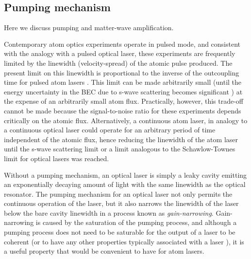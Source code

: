 \subsection{Pumping mechanism}

Here we discuss pumping and matter-wave amplification.

Contemporary atom optics experiments operate in pulsed mode, and consistent with the analogy with a pulsed optical laser, these experiments are frequently limited by the linewidth (velocity-spread) of the atomic pulse produced. The present limit on this linewidth is proportional to the inverse of the outcoupling time for pulsed atom lasers \cite{Johnsson:2007}.  This limit can be made arbitrarily small (until the energy uncertainty in the BEC due to s-wave scattering becomes significant \cite{Johnsson:2007a}) at the expense of an arbitrarily small atom flux.  Practically, however, this trade-off cannot be made because the signal-to-noise ratio for these experiments depends critically on the atomic flux.  Alternatively, a continuous atom laser, in analogy to a continuous optical laser could operate for an arbitrary period of time independent of the atomic flux, hence reducing the linewidth of the atom laser until the s-wave scattering limit \cite{Johnsson:2007a} or a limit analogous to the Schawlow-Townes limit for optical lasers \cite{Schawlow:1958} was reached.


Without a pumping mechanism, an optical laser is simply a leaky cavity emitting an exponentially decaying amount of light with the same linewidth as the optical resonator.  The pumping mechanism for an optical laser not only permits the continuous operation of the laser, but it also narrows the linewidth of the laser below the bare cavity linewidth in a process known as \emph{gain-narrowing}. Gain-narrowing is caused by the saturation of the pumping process, and although a pumping process does not need to be saturable for the output of a laser to be coherent (or to have any other properties typically associated with a laser \cite{Wiseman:1997ba}), it is a useful property that would be convenient to have for atom lasers.



